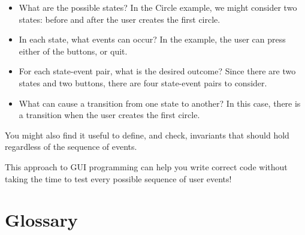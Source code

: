 \documentclass[10pt]{book}
\begin{document}
\begin{itemize}

\item What are the possible states?  In the Circle example, we
might consider two states: before and after the user creates the
first circle.

\item In each state, what events can occur?  In the example,
the user can press either of the buttons, or quit.

\item For each state-event pair, what is the desired outcome?
Since there are two states and two buttons, there are four
state-event pairs to consider.

\item What can cause a transition from one state to another?
In this case, there is a transition when the user creates
the first circle.

\end{itemize}

You might also find it useful to define, and check, invariants that
should hold regardless of the sequence of events.

This approach to GUI programming can help you write correct
code without taking the time to test every possible sequence
of user events!


\section{Glossary}
\end{document}
